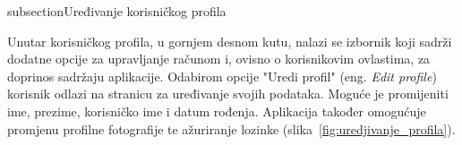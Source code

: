 subsection{Uređivanje korisničkog profila}

Unutar korisničkog profila, u gornjem desnom kutu, nalazi se izbornik koji sadrži dodatne opcije za upravljanje računom i, ovisno o korisnikovim ovlastima, za doprinos sadržaju aplikacije. Odabirom opcije "Uredi profil" (eng. \textit{Edit profile}) korisnik odlazi na stranicu za uređivanje svojih podataka. Moguće je promijeniti ime, prezime, korisničko ime i datum rođenja. Aplikacija također omogućuje promjenu profilne fotografije te ažuriranje lozinke (slika~\ref{fig:uredjivanje_profila}).

\begin{figure}[H]
    \centering
    \begin{subfigure}[b]{0.35\textwidth}
        \centering

\end{subfigure}
\end{figure}
